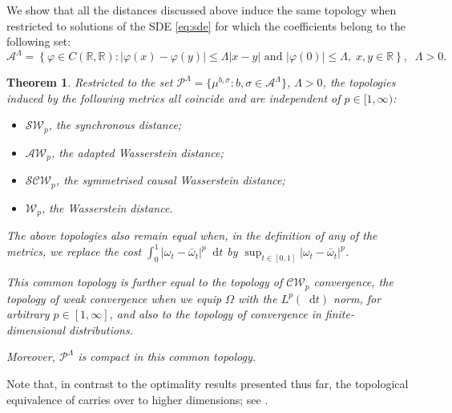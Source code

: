 \documentclass[oneside]{amsart}
\newtheorem{theorem}{Theorem}[section]
\theoremstyle{definition}
\newcommand{\AW}{\mathcal A\mathcal W}
\newcommand{\W}{\mathcal W}
\newcommand{\R}{\mathbb R}
\newcommand{\A}{\mathcal A}
\newcommand{\Pc}{\mathcal P}
\newcommand{\CW}{\mathcal C\mathcal W}
\newcommand{\SCW}{\mathcal S\mathcal C\mathcal W}
\newcommand{\SW}{\mathcal{SW}}
\newcommand{\D}{\mathop{}\!\mathrm{d}}
\def\R{{\mathbb R}}
\numberwithin{equation}{section}
\begin{document}
	We show that all the distances discussed above induce the same topology when restricted to solutions of the SDE \eqref{eq:sde} for which the coefficients belong to the following set:
\begin{equation}
	\A^\Lambda
	=
	\!\left\{\varphi\in C(\R,\R)\colon
	 |\varphi(x)-\varphi(y)|\le \Lambda |x-y|
	 \textrm{ and }
	 |\varphi(0)|\le \Lambda,
	 \;x,y\in\R
	 \right\},
	 \;\; \Lambda>0.
\end{equation}

	
\begin{theorem}\label{thm:topologies}
	Restricted to the set 
	$\Pc^\Lambda=\{
 	\mu^{b,\sigma}:b,\sigma\in\A^\Lambda\}$, $\Lambda>0$,
	the topologies induced by the following metrics all coincide and are independent of $p\in[1,\infty)$: 
	\begin{itemize}[label = ---]
		\item $\SW_p$, the synchronous distance;
		\item $\AW_p$, the adapted Wasserstein distance;
		\item $\SCW_p$, the symmetrised causal Wasserstein distance;
		\item $\W_p$, the Wasserstein distance.
	\end{itemize}
	The above topologies also remain equal when, in the definition of any of the metrics, we replace the cost $\int_0^1 |\omega_t - \bar \omega_t|^p \D t$ by $\sup_{t \in [0, 1]}|\omega_t - \bar \omega_t|^p$.
	
	This common topology is further equal to the topology of $\CW_p$ convergence, the topology of weak convergence when we equip $\Omega$ with the $L^p(\D t)$ norm, for arbitrary $p \in [1, \infty]$, and also to the topology of convergence in finite-dimensional distributions. 
	
	Moreover, $\Pc^\Lambda$ is compact in this common topology.  
\end{theorem}

	Note that, in contrast to the optimality results presented thus far, the topological equivalence of  carries over to higher dimensions; see .
	
\end{document}
